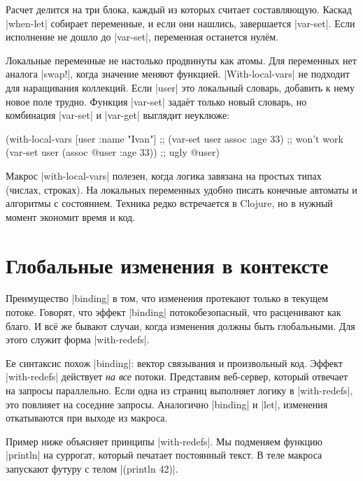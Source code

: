 Расчет делится на три блока, каждый из которых считает составляющую. Каскад
\spverb|when-let| собирает переменные, и если они нашлись, завершается
\spverb|var-set|. Если исполнение не дошло до \spverb|var-set|, переменная
останется нул\"{е}м.

Локальные переменные не настолько продвинуты как атомы. Для переменных нет
аналога \spverb|swap!|, когда значение меняют функцией. \spverb|With-local-vars|
не подходит для наращивания коллекций. Если \spverb|user| это локальный словарь,
добавить к нему новое поле трудно. Функция \spverb|var-set| зада\"{е}т только
новый словарь, но комбинация \spverb|var-set| и \spverb|var-get| выглядит
неуклюже:

\begin{english}
  \begin{clojure}
(with-local-vars [user {:name "Ivan"}]
  ;; (var-set user assoc :age 33) ;; won't work
  (var-set user (assoc @user :age 33)) ;; ugly
  @user)
  \end{clojure}
\end{english}

Макрос \spverb|with-local-vars| полезен, когда логика завязана на простых типах
(числах, строках). На локальных переменных удобно писать конечные автоматы и
алгоритмы с состоянием. Техника редко встречается в Clojure, но в нужный момент
экономит время и код.

\section{Глобальные изменения в контексте}

\label{with-redefs}

Преимущество \spverb|binding| в том, что изменения протекают только в текущем
потоке. Говорят, что эффект \spverb|binding| потокобезопасный, что расценивают
как благо. И вс\"{е} же бывают случаи, когда изменения должны быть глобальными. Для
этого служит форма \spverb|with-redefs|.

Ее синтаксис похож \spverb|binding|: вектор связывания и произвольный
код. Эффект \spverb|with-redefs| действует \emph{на все} потоки. Представим
веб-сервер, который отвечает на запросы параллельно. Если одна из страниц
выполняет логику в \spverb|with-redefs|, это повлияет на соседние
запросы. Аналогично \spverb|binding| и \spverb|let|, изменения откатываются при
выходе из макроса.

Пример ниже объясняет принципы \spverb|with-redefs|. Мы подменяем функцию
\spverb|println| на суррогат, который печатает постоянный текст. В теле макроса
запускают футуру с телом \spverb|(println 42)|.

